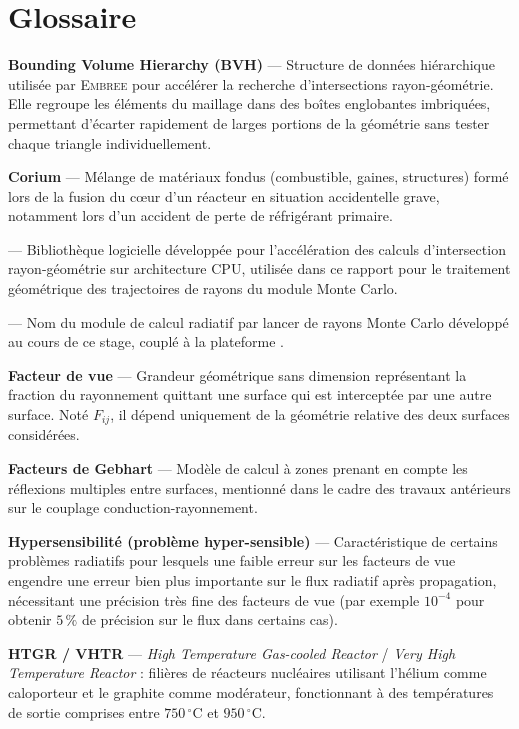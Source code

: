 
\section*{Glossaire}


\textbf{Bounding Volume Hierarchy (BVH)} — Structure de données hiérarchique utilisée par \textsc{Embree} pour accélérer la recherche d'intersections rayon-géométrie. Elle regroupe les éléments du maillage dans des boîtes englobantes imbriquées, permettant d'écarter rapidement de larges portions de la géométrie sans tester chaque triangle individuellement.

\textbf{Corium} — Mélange de matériaux fondus (combustible, gaines, structures) formé lors de la fusion du cœur d'un réacteur en situation accidentelle grave, notamment lors d'un accident de perte de réfrigérant primaire.

\textbf{\emb} — Bibliothèque logicielle développée pour l'accélération des calculs d'intersection rayon-géométrie sur architecture CPU, utilisée dans ce rapport pour le traitement géométrique des trajectoires de rayons du module Monte Carlo.

\textbf{\ETT} — Nom du module de calcul radiatif par lancer de rayons Monte Carlo développé au cours de ce stage, couplé à la plateforme \trust.

\textbf{Facteur de vue} — Grandeur géométrique sans dimension représentant la fraction du rayonnement quittant une surface qui est interceptée par une autre surface. Noté $F_{ij}$, il dépend uniquement de la géométrie relative des deux surfaces considérées.

\textbf{Facteurs de Gebhart} — Modèle de calcul à zones prenant en compte les réflexions multiples entre surfaces, mentionné dans le cadre des travaux antérieurs sur le couplage conduction-rayonnement.

\textbf{Hypersensibilité (problème hyper-sensible)} — Caractéristique de certains problèmes radiatifs pour lesquels une faible erreur sur les facteurs de vue engendre une erreur bien plus importante sur le flux radiatif après propagation, nécessitant une précision très fine des facteurs de vue (par exemple $10^{-4}$ pour obtenir $5\,\%$ de précision sur le flux dans certains cas).

\textbf{HTGR / VHTR} — \textit{High Temperature Gas-cooled Reactor} / \textit{Very High Temperature Reactor} : filières de réacteurs nucléaires utilisant l'hélium comme caloporteur et le graphite comme modérateur, fonctionnant à des températures de sortie comprises entre $750\,^\circ$C et $950\,^\circ$C.

